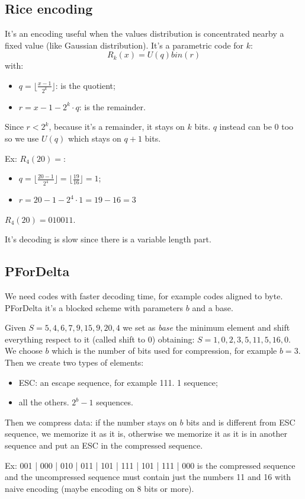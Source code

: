 \subsection{Rice encoding}
It's an encoding useful when the values distribution is concentrated nearby a fixed value (like Gaussian distribution).
It's a parametric code for $k$:
$$
    R_k(x) = U(q) bin(r)
$$
with:
\begin{itemize}
    \item $q = \lfloor \frac{x-1}{2^k} \rfloor$: is the quotient;
    \item $r = x-1 - 2^k \cdot q$: is the remainder. 
\end{itemize}
Since $r < 2^k$, because it's a remainder, it stays on $k$ bits. 
$q$ instead can be 0 too so we use $U(q)$ which stays on $q+1$ bits.

Ex: $R_4(20) = $:
\begin{itemize}
    \item $q = \lfloor \frac{20-1}{2^4} \rfloor = \lfloor \frac{19}{16} \rfloor = 1 $;
    \item $r = 20-1-2^4\cdot 1 = 19-16 = 3$
\end{itemize}
$R_4(20) = 01 0011$.

It's decoding is slow since there is a variable length part.

\subsection{PForDelta}
We need codes with faster decoding time, for example codes aligned to byte.
PForDelta it's a blocked scheme with parameters $b$ and a base.

Given $S = 5, 4, 6, 7, 9, 15, 9, 20, 4$ we set as \emph{base} the minimum element and shift everything respect to it (called shift to 0) obtaining: $S = 1, 0, 2, 3, 5, 11, 5, 16, 0$.
We choose $b$ which is the number of bits used for compression, for example $b = 3$.
Then we create two types of elements:
\begin{itemize}
    \item ESC: an escape sequence, for example 111. 1 sequence;
    \item all the others. $2^b - 1$ sequences.
\end{itemize}
Then we compress data: if the number stays on $b$ bits and is different from ESC sequence, we memorize it as it is, otherwise we memorize it as it is in another sequence and put an ESC in the compressed sequence.

Ex: 001 | 000 | 010 | 011 | 101 | 111 | 101 | 111 | 000 is the compressed sequence and the uncompressed sequence must contain just the numbers 11 and 16 with naive encoding (maybe encoding on 8 bits or more).

